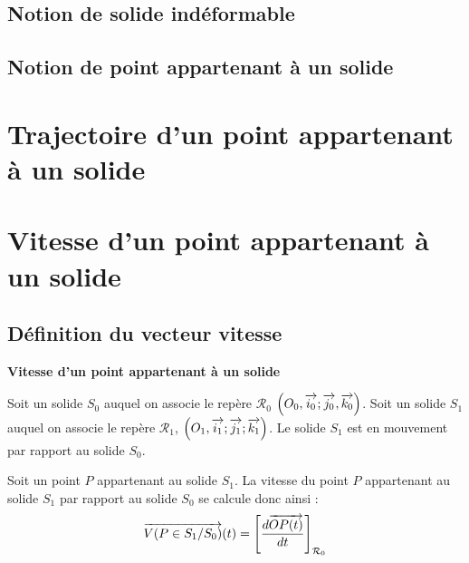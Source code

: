 \documentclass[10pt,oneside]{article}
\begin{document}
\subsection{Notion de solide indéformable}
\subsection{Notion de point appartenant à un solide}

\section{Trajectoire d'un point appartenant à un solide}

\section{Vitesse d'un point appartenant à un solide}



\subsection{Définition du vecteur vitesse}

\begin{defi}
\textbf{Vitesse d'un point appartenant à un solide}

Soit un solide $S_0$ auquel on associe le repère $\mathcal{R}_0$ $\left(O_0,\overrightarrow{i_0};\overrightarrow{j_0},\overrightarrow{k_0} \right)$.  Soit un solide $S_1$ auquel on associe le repère $\mathcal{R}_1$,  $\left(O_1,\overrightarrow{i_1};\overrightarrow{j_1};\overrightarrow{k_1} \right)$. Le solide $S_1$ est en mouvement par rapport au solide $S_0$. 

Soit un point $P$ appartenant au solide $S_1$. La vitesse du point $P$ appartenant au solide $S_1$ par rapport au solide $S_0$ se calcule donc ainsi : 
$$
\overrightarrow{V(P\in S_1/S_0)}(t) = \left[\dfrac{d\overrightarrow{OP(t)}}{dt}\right]_{\mathcal{R}_0}
$$
\end{defi}
\end{document}
